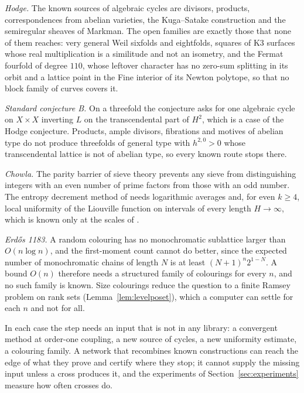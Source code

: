 \emph{Hodge.} The known sources of algebraic cycles are divisors, products, correspondences from abelian varieties, the Kuga--Satake construction and the semiregular sheaves of Markman. The open families are exactly those that none of them reaches: very general Weil sixfolds and eightfolds, squares of K3 surfaces whose real multiplication is a similitude and not an isometry, and the Fermat fourfold of degree $110$, whose leftover character has no zero-sum splitting in its orbit and a lattice point in the Fine interior of its Newton polytope, so that no block family of curves covers it.

\emph{Standard conjecture B.} On a threefold the conjecture asks for one algebraic cycle on $X\times X$ inverting $L$ on the transcendental part of $H^{2}$, which is a case of the Hodge conjecture. Products, ample divisors, fibrations and motives of abelian type do not produce threefolds of general type with $h^{2,0}>0$ whose transcendental lattice is not of abelian type, so every known route stops there.

\emph{Chowla.} The parity barrier of sieve theory prevents any sieve from distinguishing integers with an even number of prime factors from those with an odd number. The entropy decrement method of \cite{Tao16} needs logarithmic averages and, for even $k\ge4$, local uniformity of the Liouville function on intervals of every length $H\to\infty$, which is known only at the scales of \cite{MRT23,Pil26}.

\emph{Erd\H{o}s 1183.} A random colouring has no monochromatic sublattice larger than $O(n\log n)$, and the first-moment count cannot do better, since the expected number of monochromatic chains of length $N$ is at least $(N+1)^{n}2^{1-N}$. A bound $O(n)$ therefore needs a structured family of colourings for every $n$, and no such family is known. Size colourings reduce the question to a finite Ramsey problem on rank sets (Lemma~\ref{lem:levelposet}), which a computer can settle for each $n$ and not for all.

In each case the step needs an input that is not in any library: a convergent method at order-one coupling, a new source of cycles, a new uniformity estimate, a colouring family. A network that recombines known constructions can reach the edge of what they prove and certify where they stop; it cannot supply the missing input unless a cross produces it, and the experiments of Section~\ref{sec:experiments} measure how often crosses do.
